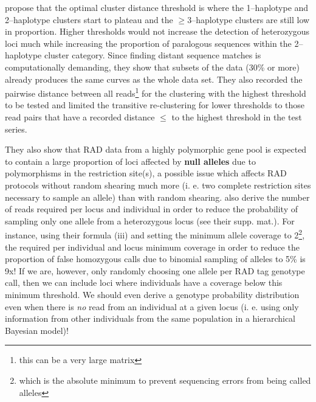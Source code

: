 \documentclass{article}\usepackage[]{graphicx}\usepackage[]{color}
\begin{document}
\cite{Ilut2014} propose that the optimal cluster distance threshold is where the 1--haplotype and 2--haplotype clusters start to plateau and the $\ge$3--haplotype clusters are still low in proportion. Higher thresholds would not increase the detection of heterozygous loci much while increasing the proportion of paralogous sequences within the 2--haplotype cluster category. Since finding distant sequence matches is computationally demanding, they show that subsets of the data (30\% or more) already produces the same curves as the whole data set. They also recorded the pairwise distance between all reads\footnote{this can be a very large matrix} for the clustering with the highest threshold to be tested and limited the transitive re-clustering for lower thresholds to those read pairs that have a recorded distance $\le$ to the highest threshold in the test series. 

They also show that RAD data from a highly polymorphic gene pool is expected to contain a large proportion of loci affected by \textbf{null alleles} due to polymorphisms in the restriction site(s), a possible issue which affects RAD protocols without random shearing much more (i. e. two complete restriction sites necessary to sample an allele) than with random shearing. \cite{Ilut2014} also derive the number of reads required per locus and individual in order to reduce the probability of sampling only one allele from a heterozygous locus (see their supp. mat.). For instance, using their formula (iii) and setting the minimum allele coverage to 2\footnote{which is the absolute minimum to prevent sequencing errors from being called alleles}, the required per individual and locus minimum coverage in order to reduce the proportion of false homozygous calls due to binomial sampling of alleles to 5\% is 9x! If we are, however, only randomly choosing one allele per RAD tag genotype call, then we can include loci where individuals have a coverage below this minimum threshold. We should even derive a genotype probability distribution even when there is \emph{no} read from an individual at a given locus (i. e. using only information from other individuals from the same population in a hierarchical Bayesian model)! 
\end{document}
